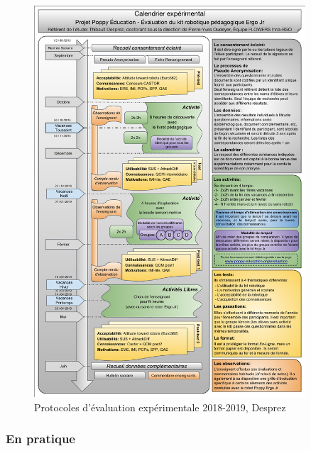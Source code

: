       \begin{figure}[!h]
        \centering
        \includegraphics[width=0.9\textwidth]{Annexe/autre/Protocole_2018.pdf}
        \caption{Protocoles d'évaluation expérimentale 2018-2019, Desprez~\cite{RI}}\label{fig:proto18}
      \end{figure}
    \subsubsection{En pratique}
